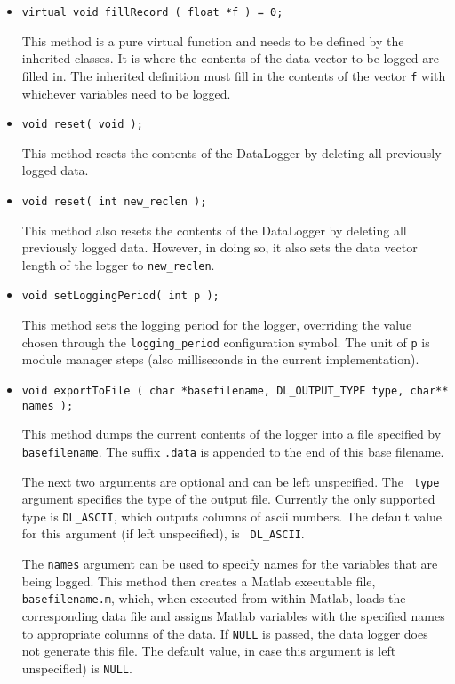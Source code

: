 \localinterface

\begin{itemize}
\item{\tt virtual void  fillRecord ( float *f ) = 0;} \par
This method is a pure virtual function and needs to be defined by the
inherited classes. It is where the contents of the data vector to be logged
are filled in. The inherited definition must fill in the contents of the
vector {\tt *f} with whichever variables need to be logged.

\item{\tt void reset( void );} \par
This method resets the contents of the DataLogger by deleting all previously
logged data.

\item{\tt void reset( int new\_reclen );} \par
This method also resets the contents of the DataLogger by deleting all
previously logged data. However, in doing so, it also sets the data vector
length of the logger to {\tt new\_reclen}.

\item{\tt void setLoggingPeriod( int p );} \par
This method sets the logging period for the logger, overriding the value
chosen through the {\tt logging\_period} configuration symbol. The unit of
{\tt p} is module manager steps (also milliseconds in the current
implementation).

\item{\tt void exportToFile ( char *basefilename, DL\_OUTPUT\_TYPE type, char** names );} \par
This method dumps the current contents of the logger into a file specified
by {\tt *basefilename}. The suffix {\tt .data} is appended to the end of
this base filename.

The next two arguments are optional and can be left unspecified. The {\tt
type} argument specifies the type of the output file. Currently the only
supported type is {\tt DL\_ASCII}, which outputs columns of ascii
numbers. The default value for this argument (if left unspecified), is {\tt
DL\_ASCII}.

The {\tt names} argument can be used to specify names for the variables that
are being logged. This method then creates a Matlab executable file, {\tt
  basefilename.m}, which, when executed from within Matlab, loads the
corresponding data file and assigns Matlab variables with the specified
names to appropriate columns of the data. If {\tt NULL} is passed, the data
logger does not generate this file. The default value, in case this argument
is left unspecified) is {\tt NULL}.


\end{itemize}
